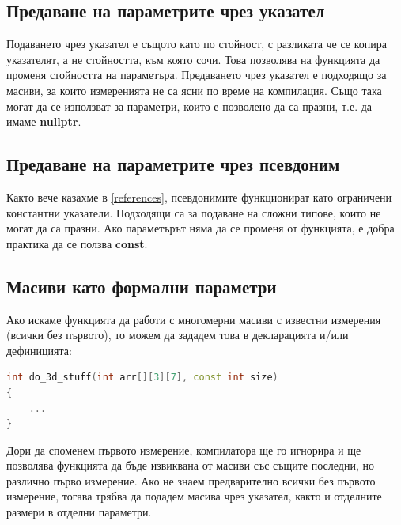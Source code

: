 \documentclass[fleqn,12pt]{article}
\begin{document}
\subsection{Предаване на параметрите чрез указател}
Подаването чрез указател е същото като по стойност, с разликата че се копира указателят, а не стойността, към която сочи.
Това позволява на функцията да променя стойността на параметъра. Предаването чрез указател е подходящо за масиви, за които 
измеренията не са ясни по време на компилация. Също така могат да се използват за параметри, които е позволено да са празни, т.е.
да имаме \textbf{nullptr}.

\subsection{Предаване на параметрите чрез псевдоним}
Както вече казахме в \ref{references}, псевдонимите функционират като ограничени константни указатели.
Подходящи са за подаване на сложни типове, които не могат да са празни. Ако параметърът няма да се променя от функцията,
е добра практика да се ползва \textbf{const}.

\subsection{Масиви като формални параметри}
Ако искаме функцията да работи с многомерни масиви с известни измерения (всички без първото), то можем да зададем това в декларацията и/или дефиницията:
\begin{lstlisting}[language=C++, caption=Arrays as arguments]
int do_3d_stuff(int arr[][3][7], const int size)
{
    ...
}
\end{lstlisting}

Дори да споменем първото измерение, компилатора ще го игнорира и ще позволява функцията да бъде извиквана от масиви със същите последни, 
но различно първо измерение. Ако не знаем предварително всички без първото измерение, тогава трябва да подадем масива чрез указател, 
както и отделните размери в отделни параметри.
\end{document}
